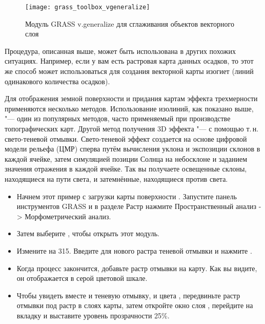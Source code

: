 \begin{figure}[h]
 \centering
 \texttt{[image: grass\_toolbox\_vgeneralize]}
 \caption{Модуль GRASS v.generalize для сглаживания объектов векторного слоя \wincaption}\label{fig:grass_toolbox_vgeneralize}
\end{figure}

\begin{Tip}\caption{\textsc{Другие применения модуля r.contour}}

Процедура, описанная выше, может быть использована в других похожих
ситуациях. Например, если у вам есть растровая карта данных осадков, то
этот же способ может использоваться для создания векторной карты изогиет
(линий одинакового количества осадков).
\end{Tip}


Для отображения земной поверхности и придания картам эффекта
трехмерности применяются несколько методов. Использование изолиний, как
показано выше, "--- один из популярных методов, часто применяемый при
производстве топографических карт. Другой метод получения 3D эффекта "---
с помощью т.\,н. свето-теневой отмывки. Свето-теневой эффект создается
на основе цифровой модели рельефа (ЦМР) сперва путём вычисления уклона
и экспозиции склонов в каждой ячейке, затем симуляцией позиции Солнца на
небосклоне и заданием значения отражения в каждой ячейке. Так вы
получаете освещенные склоны, находящиеся на пути света, и затемнённые,
находящиеся против света.

\begin{itemize}[label=--]
\item Начнем этот пример с загрузки карты поверхности .
Запустите панель инструментов GRASS и в разделе Растр нажмите
Пространственный анализ -> Морфометрический анализ.
\item Затем выберите , чтобы открыть этот
модуль.
\item Измените  на 315. Введите
 для нового растра теневой отмывки и нажмите
.
\item Когда процесс закончится, добавьте растр отмывки на карту. Как вы
видите, он отображается в серой цветовой шкале.
\item Чтобы увидеть вместе и теневую отмывку, и цвета ,
передвиньте растр отмывки под растр  в слоях карты,
затем откройте окно  слоя ,
перейдите на вкладку  и выставите уровень
прозрачности 25\%.
\end{itemize}

